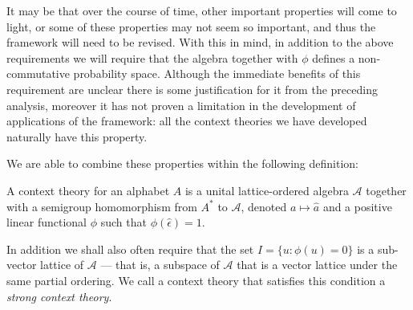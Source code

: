 \begin{itemize}
\end{itemize}
It may be that over the course of time, other important properties will come to light, or some of these properties may not seem so important, and thus the framework will need to be revised. With this in mind, in addition to the above requirements we will require that the algebra together with $\phi$ defines a non-commutative probability space. Although the immediate benefits of this requirement are unclear there is some justification for it from the preceding analysis, moreover it has not proven a limitation in the development of applications of the framework: all the context theories we have developed naturally have this property.

We are able to combine these properties within the following definition:
\begin{defn}
A context theory for an alphabet $A$ is a unital lattice-ordered algebra $\mathcal{A}$ together with a semigroup homomorphism from $A^*$ to $\mathcal{A}$, denoted $a \mapsto \hat{a}$ and a positive linear functional $\phi$ such that $\phi(\hat{\epsilon}) = 1$.
\end{defn}
In addition we shall also often require that the set $I = \{u : \phi(u) = 0\}$ is a sub-vector lattice of $\mathcal{A}$ --- that is, a subspace of $\mathcal{A}$ that is a vector lattice under the same partial ordering. We call a context theory that satisfies this condition a \emph{strong context theory}.

